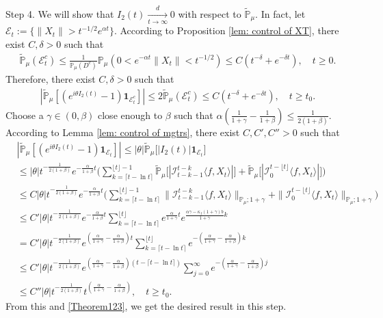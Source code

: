\documentclass[12pt,a4paper]{amsart}
\theoremstyle{plain}
\theoremstyle{definition}
\numberwithin{equation}{section}
\begin{document}
    Step 4. 
    We will show that $I_2(t) \xrightarrow[t\to \infty]{d} 0$ with respect to $\mathbb{\tilde{P}}_{\mu}$.
    In fact, let $\mathcal{E}_t:=\{\|X_t\|>t^{-1/2}e^{\alpha t}\}$. According to Proposition \ref{lem: control of XT}, there exist $C, \delta>0$ such that
\begin{equation}\begin{split}
    \mathbb{\tilde{P}}_{\mu}(\mathcal{E}^c_t)\leq \frac{1}{\mathbb{P}_{\mu}(D^c)}\mathbb{P}_{\mu}(0<e^{-\alpha t}\|X_t\|<t^{-1/2})\leq C( t^{-\delta}+e^{-\delta t}), \quad t\geq0.
\end{split}\end{equation}
    Therefore, there exist $C, \delta>0$ such that
\begin{equation}\begin{split}\label{Theorem123}
    |\mathbb{\tilde{P}}_{\mu}[(e^{i\theta I_2(t)}-1)\mathbf{1}_{\mathcal{E}^c_t}]|
    \leq 2\mathbb{\tilde{P}}_{\mu}(\mathcal{E}^c_t)\leq C(t^{-\delta}+e^{-\delta t}),
    \quad t\geq t_0.
\end{split}\end{equation}
    Choose a $\gamma\in (0,\beta)$ close enough to $\beta$ such that $\alpha(\frac{1}{1+\gamma}-\frac{1}{1+\beta})\leq \frac{1}{2(1+\beta)}$.
	According to Lemma \ref{lem: control of mgtrs}, there exist $C,C',C''>0$ such that
\begin{align*}
    &|\mathbb{\tilde{P}}_{\mu} [ (e^{i\theta I_2(t)}-1)\mathbf{1}_{\mathcal{E}_t}]|
    \leq |\theta| \mathbb{\tilde{P}}_{\mu} \big[ |I_2(t)|\mathbf{1}_{\mathcal{E}_t}\big]
    \\&\leq|\theta| t^{-\frac{1}{2(1+\beta)}}e^{-\frac{\alpha}{1+\beta}t}\Big(\sum_{k=\lceil t-\ln t \rceil}^{\lfloor t \rfloor - 1}\mathbb{\tilde{P}}_{\mu}\big[| \mathcal{I}_{t-k-1}^{t-k}\langle f,X_t\rangle|\big] + \mathbb{\tilde{P}}_{\mu}\big[| \mathcal{I}_{0}^{t-\lfloor t\rfloor}\langle f,X_t\rangle|\big]\Big)
    \\& \leq C |\theta| t^{-\frac{1}{2(1+\beta)}}e^{-\frac{\alpha}{1+\beta}t}\Big(\sum_{k=\lceil t-\ln t \rceil}^{\lfloor t \rfloor - 1}\|\mathcal{I}_{t-k-1}^{t-k}\langle f,X_t\rangle\|_{\mathbb P_\mu; 1+\gamma} + \|\mathcal I_0^{t-\lfloor t \rfloor} \langle f, X_t\rangle\|_{\mathbb P_\mu;1+\gamma}\Big)
    \\ &\leq C' |\theta| t^{-\frac{1}{2(1+\beta)}}e^{-\frac{\alpha}{1+\beta}t}\sum_{k=\lceil t-\ln t \rceil}^{\lfloor t \rfloor}e^{\frac{\alpha}{1+\gamma}t}e^{\frac{\alpha\gamma-\kappa_f(1+\gamma)b}{1+\gamma}k}\\
    &= C' |\theta| t^{-\frac{1}{2(1+\beta)}}e^{(\frac{\alpha }{1+\gamma}-\frac{\alpha }{1+\beta})t} \sum_{k=\lceil t-\ln t \rceil}^{\lfloor t \rfloor}e^{-(\frac{\alpha}{1+\gamma}-\frac{\alpha}{1+\beta})k}\\
    &\leq C' |\theta| t^{-\frac{1}{2(1+\beta)}}e^{(\frac{\alpha }{1+\gamma}-\frac{\alpha }{1+\beta})(t - \lceil t - \ln t\rceil)} \sum_{j=0}^{\infty}e^{-(\frac{\alpha}{1+\gamma}-\frac{\alpha}{1+\beta})j}\\
    &\leq C''|\theta| t^{-\frac{1}{2(1+\beta)}}t^{(\frac{\alpha}{1+\gamma}- \frac{\alpha}{1+\beta})},
    \quad t\geq t_0.
\end{align*}
	From this and \eqref{Theorem123}, we get the desired result in this step.
\end{document}

